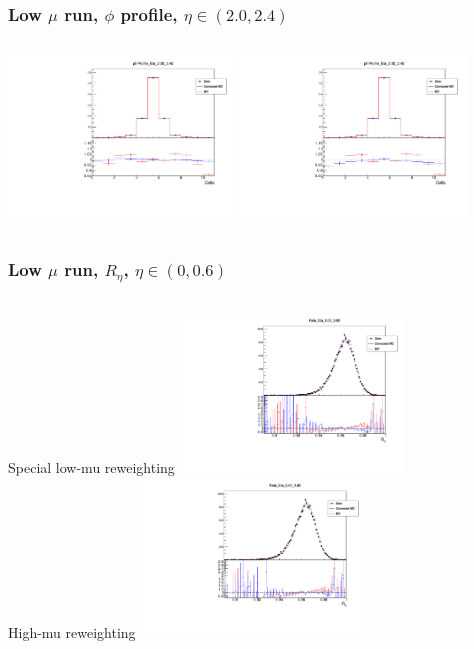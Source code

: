 \documentclass{beamer}
\begin{document}
\begin{frame}
\frametitle{Low $\mu$ run, $\phi$ profile, $\eta \in (2.0,2.4)$}

\begin{columns}[t]

\centering
{}
\includegraphics[width=6cm]{phiProfile_Rew_Eta_20_24_lowmu_13TeV_LocalWB.pdf}
\centering
{}
\includegraphics[width=6cm]{phiProfile_Eta_20_24_lowmu_13TeV_AthenaWB.pdf}
\end{columns}
\end{frame}
\begin{frame}
\frametitle{Low $\mu$ run, $R_{\eta}$, $\eta \in (0,0.6)$}

\begin{columns}[t]

\centering
\normalsize{Special low-mu reweighting}
\includegraphics[width=6cm]{Reta_Rew_Eta_0_6_lowmu_13TeV_LocalWB.pdf}\\
\centering
\normalsize{High-mu reweighting}
\includegraphics[width=6cm]{Reta_Eta_0_6_lowmu_13TeV_AthenaWB.pdf}\\
\end{columns}
\end{frame}
\end{document}
